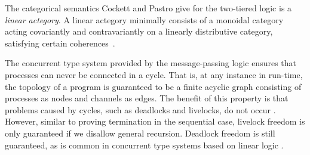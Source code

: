 \documentclass[11pt]{article}
\begin{document}
The categorical semantics Cockett and Pastro give for the two-tiered logic is a {\em linear actegory}.
A linear actegory minimally consists of a monoidal category acting covariantly and contravariantly on a linearly distributive category, 
satisfying certain coherences~\cite{CoP07, CS97}. 

The concurrent type system provided by the message-passing logic ensures that processes can never be connected in a cycle.
That is, at any instance in run-time, the topology of a program is guaranteed to be a finite acyclic graph consisting of processes as nodes and channels as edges.
The benefit of this property is that problems caused by cycles, such as deadlocks and livelocks, do not occur \cite{Ly18}.
However, similar to proving termination in the sequential case, livelock freedom is only guaranteed if we disallow general recursion.
Deadlock freedom is still guaranteed, as is common in concurrent type systems based on linear logic \cite{BELLIN199411, CPf2010, Wa12, CairesPT16, QKB21}.
\end{document}
